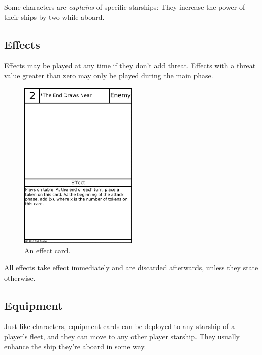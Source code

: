 \documentclass[11pt, a4paper]{article}
\begin{document}
Some characters are \emph{captains} of specific starships: They increase the
power of their ships by two while aboard.

\subsection{Effects}

Effects may be played at any time if they don't add threat. Effects with a
threat value greater than zero may only be played during the main phase.

\begin{figure}
  \centering
  \includegraphics[width=0.5\textwidth]{exampleeffect.png}
  \caption{An effect card.}
\end{figure}

All effects take effect immediately and are discarded afterwards, unless they
state otherwise.

\subsection{Equipment}

Just like characters, equipment cards can be deployed to any starship of a
player's fleet, and they can move to any other player starship. They usually
enhance the ship they're aboard in some way.
\end{document}
